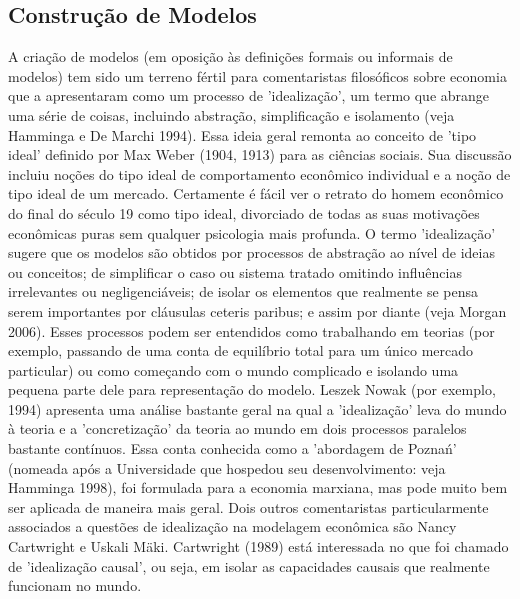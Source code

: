 \documentclass[a4paper,12pt]{article}[abntex2]
\begin{document}
\subsection{\textbf{Construção de Modelos}}
A criação de modelos (em oposição às definições formais ou informais de modelos) tem sido um terreno fértil para comentaristas filosóficos sobre economia que a apresentaram como um processo de 'idealização', um termo que abrange uma série de coisas, incluindo abstração, simplificação e isolamento (veja Hamminga e De Marchi 1994). Essa ideia geral remonta ao conceito de 'tipo ideal' definido por Max Weber (1904, 1913) para as ciências sociais. Sua discussão incluiu noções do tipo ideal de comportamento econômico individual e a noção de tipo ideal de um mercado. Certamente é fácil ver o retrato do homem econômico do final do século 19 como tipo ideal, divorciado de todas as suas motivações econômicas puras sem qualquer psicologia mais profunda. O termo 'idealização' sugere que os modelos são obtidos por processos de abstração ao nível de ideias ou conceitos; de simplificar o caso ou sistema tratado omitindo influências irrelevantes ou negligenciáveis; de isolar os elementos que realmente se pensa serem importantes por cláusulas ceteris paribus; e assim por diante (veja Morgan 2006). Esses processos podem ser entendidos como trabalhando em teorias (por exemplo, passando de uma conta de equilíbrio total para um único mercado particular) ou como começando com o mundo complicado e isolando uma pequena parte dele para representação do modelo. Leszek Nowak (por exemplo, 1994) apresenta uma análise bastante geral na qual a 'idealização' leva do mundo à teoria e a 'concretização' da teoria ao mundo em dois processos paralelos bastante contínuos. Essa conta conhecida como a 'abordagem de Poznań' (nomeada após a Universidade que hospedou seu desenvolvimento: veja Hamminga 1998), foi formulada para a economia marxiana, mas pode muito bem ser aplicada de maneira mais geral. Dois outros comentaristas particularmente associados a questões de idealização na modelagem econômica são Nancy Cartwright e Uskali Mäki. Cartwright (1989) está interessada no que foi chamado de 'idealização causal', ou seja, em isolar as capacidades causais que realmente funcionam no mundo.
\end{document}
